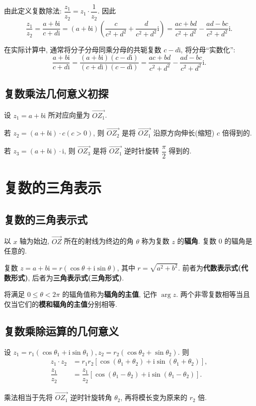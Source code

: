 \documentclass[titlepage]{ctexart}
\begin{document}
由此定义复数除法: $\dfrac{z_1}{z_2} = z_1 \cdot \dfrac{1}{z_2}.$ 因此
\[
\frac{z_1}{z_2} = \frac{a + b\mathrm{i}}{c + d\mathrm{i}} = (a + b\mathrm{i})\left(\frac{c}{c^2+d^2} + \frac{d}{c^2+d^2}\mathrm{i}\right)
                = \frac{ac + bd}{c^2 + d^2} - \frac{ad - bc}{c^2 + d^2}\mathrm{i}.
\]

在实际计算中, 通常将分子分母同乘分母的共轭复数 $c - d\mathrm{i}$, 将分母``实数化'':
\[
\frac{a + b\mathrm{i}}{c + d\mathrm{i}} = \frac{(a + b\mathrm{i})(c - d\mathrm{i})}{(c + d\mathrm{i})(c - d\mathrm{i})}
                                        = \frac{ac + bd}{c^2 + d^2} - \frac{ad - bc}{c^2 + d^2}\mathrm{i}.
\]

\subsection{复数乘法几何意义初探}

设 $z_1 = a + b\mathrm{i}$ 所对应向量为 $\overrightarrow{OZ_1}$.

若 $z_2 = (a + b\mathrm{i}) \cdot c(c > 0)$, 则 $\overrightarrow{OZ_2}$ 是将 $\overrightarrow{OZ_1}$ 沿原方向伸长(缩短) $c$ 倍得到的.

若 $z_3 = (a + b\mathrm{i}) \cdot \mathrm{i}$, 则 $\overrightarrow{OZ_3}$ 是将 $\overrightarrow{OZ_1}$ 逆时针旋转 $\dfrac{\pi}{2}$ 得到的.


\section{复数的三角表示}

\subsection{复数的三角表示式}

以 $x$ 轴为始边, $\overrightarrow{OZ}$ 所在的射线为终边的角 $\theta$ 称为复数 $z$ 的\textbf{辐角}.
复数 0 的辐角是任意的.

复数 $z = a + b\mathrm{i} = r(\cos \theta + \mathrm{i}\sin \theta)$, 其中 $r = \sqrt{a^2 + b^2}$. 
前者为\textbf{代数表示式(代数形式)}, 后者为\textbf{三角表示式(三角形式)}.

将满足 $0 \leqslant \theta < 2\pi$ 的辐角值称为\textbf{辐角的主值}, 记作 $\arg z$. 
两个非零复数相等当且仅当它们的\textbf{模和辐角的主值}分别相等.

\subsection{复数乘除运算的几何意义}

设 $z_1 = r_1(\cos \theta_1 + \mathrm{i}\sin \theta_1), z_2 = r_2(\cos \theta_2 + \sin \theta_2)$. 则
\begin{align*}
z_1 \cdot z_2 &= r_1r_2[\cos(\theta_1 + \theta_2) + \mathrm{i}\sin(\theta_1 + \theta_2)], \\
\dfrac{z_1}{z_2} &= \dfrac{z_1}{z_2}[\cos(\theta_1 - \theta_2) + \mathrm{i}\sin(\theta_1 - \theta_2)].
\end{align*}

乘法相当于先将 $\overrightarrow{OZ_1}$ 逆时针旋转角 $\theta_2$, 再将模长变为原来的 $r_2$ 倍.
\end{document}
